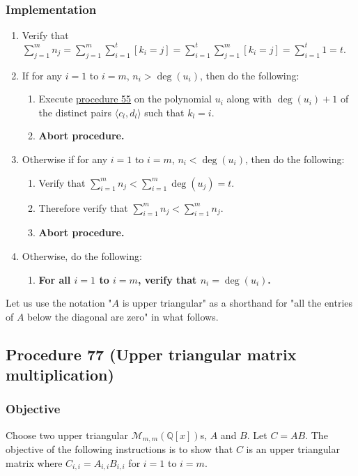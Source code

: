 \documentclass[twocolumn]{article}
\begin{document}
			\subsubsection{Implementation}
				\begin{enumerate}
					\item Verify that $\sum_{j=1}^m n_j=\sum_{j=1}^m\sum_{i=1}^t [k_i=j]=\sum_{i=1}^t\sum_{j=1}^m [k_i=j]=\sum_{i=1}^t 1=t$.
					\item If for any $i=1$ to $i=m$, $n_i>\deg(u_i)$, then do the following:
					\begin{enumerate}
						\item Execute \hyperref[sec:procedure 55]{procedure 55} on the polynomial $u_i$ along with $\deg(u_i)+1$ of the distinct pairs $\langle c_l,d_l\rangle$ such that $k_l=i$.
						\item \textbf{Abort procedure.}
					\end{enumerate}
					\item Otherwise if for any $i=1$ to $i=m$, $n_i<\deg(u_i)$, then do the following:
					\begin{enumerate}
						\item Verify that $\sum_{i=1}^m n_j<\sum_{i=1}^m \deg(u_j)=t$.
						\item Therefore verify that $\sum_{i=1}^m n_j<\sum_{i=1}^m n_j$.
						\item \textbf{Abort procedure.}
					\end{enumerate}
					\item Otherwise, do the following:
					\begin{enumerate}
						\item \textbf{For all $i=1$ to $i=m$, verify that $n_i=\deg(u_i)$.}
					\end{enumerate}
				\end{enumerate}
		Let us use the notation "$A$ is upper triangular" as a shorthand for "all the entries of $A$ below the diagonal are zero" in what follows. 
		\subsection{Procedure 77 (Upper triangular matrix multiplication)}\label{sec:procedure 77}
			\subsubsection{Objective}
				Choose two upper triangular $\mathcal{M}_{m,m}(\mathbb{Q}[x])$s, $A$ and $B$. Let $C=AB$. The objective of the following instructions is to show that $C$ is an upper triangular matrix where $C_{i,i}=A_{i,i}B_{i,i}$ for $i=1$ to $i=m$.
\end{document}
